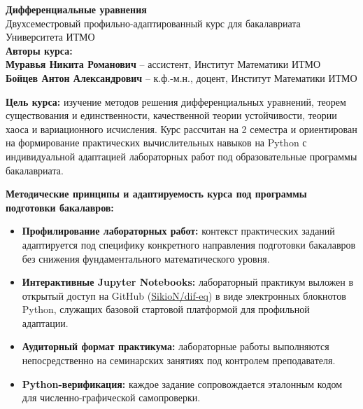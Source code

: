 \documentclass[12pt]{article}
\begin{document}
\begin{center}
    {\LARGE\textbf{Дифференциальные уравнения}}\\[0.3em]
    {\large Двухсеместровый профильно-адаптированный курс для бакалавриата Университета ИТМО}\\[0.4em]
    {\normalsize\textbf{Авторы курса:}}\\[0.2em]
    {\normalsize\textbf{Муравья Никита Романович} -- ассистент, Институт Математики ИТМО}\\[0.15em]
    {\normalsize\textbf{Бойцев Антон Александрович} -- к.ф.-м.н., доцент, Институт Математики ИТМО}\\[0.15em]
\end{center}

\begin{greenblock}
\textbf{Цель курса:} изучение методов решения дифференциальных уравнений, теорем существования и единственности, качественной теории устойчивости, теории хаоса и вариационного исчисления. Курс рассчитан на 2 семестра и ориентирован на формирование практических вычислительных навыков на Python с индивидуальной адаптацией лабораторных работ под образовательные программы бакалавриата.
\end{greenblock}

\begin{greenblock}
\textbf{Методические принципы и адаптируемость курса под программы подготовки бакалавров:}
\begin{itemize}[nosep, leftmargin=1.2em]
    \item \textbf{Профилирование лабораторных работ:} контекст практических заданий адаптируется под специфику конкретного направления подготовки бакалавров без снижения фундаментального математического уровня.
    \item \textbf{Интерактивные Jupyter Notebooks:} лабораторный практикум выложен в открытый доступ на GitHub (\href{https://github.com/SikioN/dif-eq}{SikioN/dif-eq}) в виде электронных блокнотов Python, служащих базовой стартовой платформой для профильной адаптации.
    \item \textbf{Аудиторный формат практикума:} лабораторные работы выполняются непосредственно на семинарских занятиях под контролем преподавателя.
    \item \textbf{Python-верификация:} каждое задание сопровождается эталонным кодом для численно-графической самопроверки.
\end{itemize}
\end{greenblock}
\end{document}
